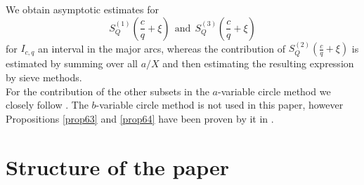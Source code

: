 \documentclass{amsart}
\newtheorem{lemma}[theorem]{Lemma}
\numberwithin{equation}{subsection}
\begin{document}


We obtain asymptotic estimates for 
$$S_Q^{(1)}\left(\frac{c}{q}+\xi\right)\ \ \text{and}\ \ S_Q^{(3)}\left(\frac{c}{q}+\xi\right)$$
for $I_{c,q}$ an interval in the major arcs, whereas the contribution of $S_Q^{(2)}\left(\frac{c}{q}+\xi\right)$ is estimated by summing over all $a/X$ and then estimating the resulting expression by sieve methods.\\
For the contribution of the other subsets in the $a$-variable circle method we closely follow \cite{maier-rassias-gold}. The $b$-variable circle method is not used in this paper, however Propositions \ref{prop63} and \ref{prop64} have been proven by it in \cite{maier-rassias-gold}.

\section{Structure of the paper}
\end{document}
